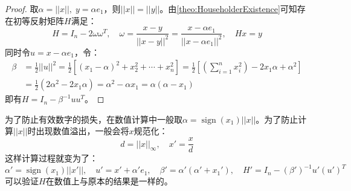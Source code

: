 \begin{proof}
	取$\alpha=||x||,\;y=\alpha e_1$，则$||x||=||y||$。由\cref{theo:HouseholderExistence}可知存在初等反射矩阵$H$满足：
	\begin{equation*}
		H=I_n-2\omega\omega^T,\quad\omega=\frac{x-y}{||x-y||^2}=\frac{x-\alpha e_1}{||x-\alpha e_1||^2},\quad Hx=y
	\end{equation*}
	同时令$u=x-\alpha e_1$，令：
	\begin{align*}
		\beta&=\frac{1}{2}||u||^2=\frac{1}{2}[(x_1-\alpha)^2+x_2^2+\cdots+x_n^2]=\frac{1}{2}\left[\left(\sum_{i=1}^{n}x_i^2\right)-2x_1\alpha+\alpha^2\right] \\
		&=\frac{1}{2}(2\alpha^2-2x_1\alpha)=\alpha^2-\alpha x_1=\alpha(\alpha-x_1)
	\end{align*}
	即有$H=I_n-\beta^{-1}uu^T$。
\end{proof}
\begin{note}
	为了防止有效数字的损失，在数值计算中一般取$\alpha=\operatorname{sign}(x_1)||x||$。为了防止计算$||x||$时出现数值溢出，一般会将$x$规范化：
	\begin{equation*}
		d=||x||_\infty,\quad x'=\frac{x}{d}
	\end{equation*}
	这样计算过程就变为了：
	\begin{equation*}
		\alpha'=\operatorname{sign}(x_1)||x'||,\quad u'=x'+\alpha' e_1,\quad\beta'=\alpha'(\alpha'+x_1'),\quad H'=I_n-(\beta')^{-1}u'(u')^T
	\end{equation*}
	可以验证$H$在数值上与原本的结果是一样的。
\end{note}

